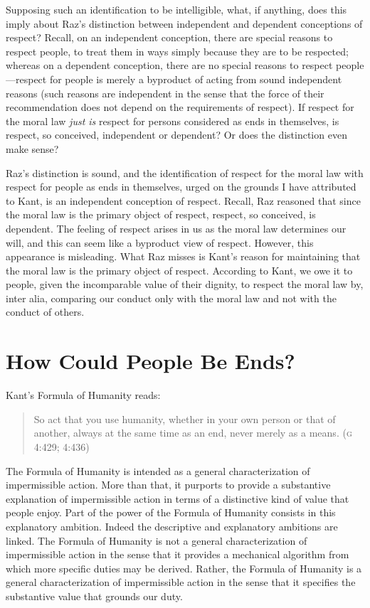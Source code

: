 \documentclass[a4paper,12pt]{article}
\begin{document}
Supposing such an identification to be intelligible, what, if anything, does this imply about Raz's distinction between independent and dependent conceptions of respect? Recall, on an independent conception, there are special reasons to respect people, to treat them in ways simply because they are to be respected; whereas on a dependent conception, there are no special reasons to respect people---respect for people is merely a byproduct of acting from sound independent reasons (such reasons are independent in the sense that the force of their recommendation does not depend on the requirements of respect). If respect for the moral law \emph{just is} respect for persons considered as ends in themselves, is respect, so conceived, independent or dependent? Or does the distinction even make sense?

Raz's distinction is sound, and the identification of respect for the moral law with respect for people as ends in themselves, urged on the grounds I have attributed to Kant, is an independent conception of respect. Recall, Raz reasoned that since the moral law is the primary object of respect, respect, so conceived, is dependent. The feeling of respect arises in us as the moral law determines our will, and this can seem like a byproduct view of respect. However, this appearance is misleading. What Raz misses is Kant's reason for maintaining that the moral law is the primary object of respect. According to Kant, we owe it to people, given the incomparable value of their dignity, to respect the moral law by, inter alia, comparing our conduct only with the moral law and not with the conduct of others.


\section{How Could People Be Ends?} \label{sec:how_could_people_be_ends} %

Kant's Formula of Humanity reads: 
\begin{quote}
	So act that you use humanity, whether in your own person or that of another, always at the same time as an end, never merely as a means. (\textsc{g} 4:429; 4:436) 
\end{quote}

The Formula of Humanity is intended as a general characterization of impermissible action. More than that, it purports to provide a substantive explanation of impermissible action in terms of a distinctive kind of value that people enjoy. Part of the power of the Formula of Humanity consists in this explanatory ambition. Indeed the descriptive and explanatory ambitions are linked. The Formula of Humanity is not a general characterization of impermissible action in the sense that it provides a mechanical algorithm from which more specific duties may be derived. Rather, the Formula of Humanity is a general characterization of impermissible action in the sense that it specifies the substantive value that grounds our duty.
\end{document}
